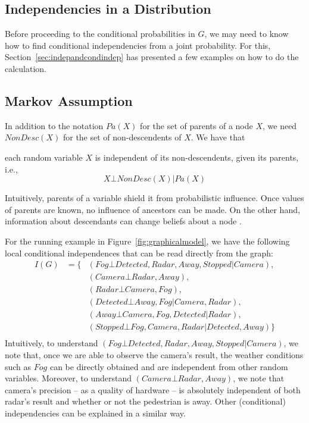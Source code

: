 \subsection{Independencies in a Distribution}\label{sec:distributionalindependencies}

Before proceeding to the conditional probabilities in $G$, we may need to know how to find conditional independencies from a joint probability. For this, Section~\ref{sec:indepandcondindep} has presented a few examples on how to do the calculation. 



 
\subsection{Markov Assumption}

In addition to the notation 
$Pa(X)$ for the set of parents of a node $X$, we need $NonDesc(X)$ for the set of non-descendents of $X$. We have that 
\begin{tcolorbox}
each random variable $X$ is independent of its non-descendents, given its parents, i.e.,
\begin{equation}
    X\bot NonDesc(X) | Pa(X)
\end{equation}
\end{tcolorbox}
Intuitively, parents of a variable shield it from probabilistic influence. Once values of parents are  known, no influence of ancestors can be made. On the other hand, information about descendants can change beliefs about a node . 

For the running example in Figure~\ref{fig:graphicalmodel}, we have the following local conditional independences that can be read directly from the graph: 
\begin{equation}
    \begin{array}{lcl}
        I(G) &  = \{ & (Fog\bot Detected, Radar, Away, Stopped | Camera),  \\
         & & (Camera \bot Radar, Away) , \\
         & & (Radar \bot Camera, Fog) , \\
         & & (Detected \bot Away, Fog | Camera, Radar) , \\
         & & (Away  \bot Camera, Fog, Detected | Radar) , \\
         & & (Stopped \bot Fog, Camera, Radar | Detected, Away) \} \\
    \end{array}
\end{equation}
Intuitively, to understand $(Fog\bot Detected, Radar, Away, Stopped | Camera)$, we note  that, once we are able to observe the camera's result, the weather conditions such as $Fog$ can be directly obtained and are independent from other random variables. Moreover, to understand $(Camera \bot Radar, Away)$, we note that camera's precision -- as a quality of hardware --  is absolutely independent of both radar's result and whether or not the pedestrian is away. Other (conditional) independencies can be explained in a similar way. 

